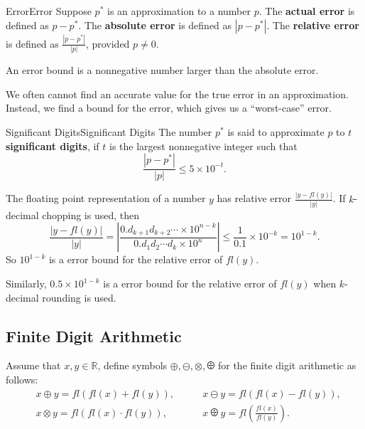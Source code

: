\documentclass[../main.tex]{subfiles}
\begin{document}
\begin{definition}{Error}{Error}
  Suppose $p^*$ is an approximation to a number $p$. The \textbf{actual error} is defined as $p - p^*$. The \textbf{absolute error} is defined as $|p - p^*|$. The \textbf{relative error} is defined as $\displaystyle \frac{|p - p^*|}{|p|}$, provided $p \neq 0$.

  An error bound is a nonnegative number larger than the absolute error.
\end{definition}

\begin{remark}
  We often cannot find an accurate value for the true error in an approximation. Instead, we find a bound for the error, which gives us a “worst-case” error.
\end{remark}

\begin{definition}{Significant Digits}{Significant Digits}
  The number $p^*$ is said to approximate $p$ to $t$ \textbf{significant digits}, if $t$ is the largest nonnegative integer such that
  \begin{equation}
    \frac{|p - p^*|}{|p|} \leq 5 \times 10^{-t}.
  \end{equation}
\end{definition}

The floating point representation of a number $y$ has relative error $\displaystyle \frac{|y - fl(y)|}{|y|}$. If $k$-decimal chopping is used, then
\begin{equation*}
  \frac{|y - fl(y)|}{|y|} = \left|\frac{0.d_{k+1} d_{k+2} \cdots \times 10^{n-k}}{0.d_1 d_2 \cdots d_k \times 10^n}\right| \leq \frac{1}{0.1} \times 10^{-k} = 10^{1-k}.
\end{equation*}
So $10^{1-k}$ is a error bound for the relative error of $fl(y)$.

Similarly, $0.5 \times 10^{1-k}$ is a error bound for the relative error of $fl(y)$ when $k$-decimal rounding is used.

\subsection{Finite Digit Arithmetic}
Assume that $x,y \in \mathbb{R}$, define symbols $\oplus, \ominus, \otimes, \odiv$ for the finite digit arithmetic as follows:
\begin{equation*}
  \begin{aligned}
    &x \oplus y = fl(fl(x) + fl(y)), \qquad &x \ominus y = fl(fl(x) - fl(y)),\\
    &x \otimes y = fl(fl(x) \cdot fl(y)), \qquad &x \odiv y = fl\left(\frac{fl(x)}{fl(y)}\right).
  \end{aligned}
\end{equation*}
\end{document}
